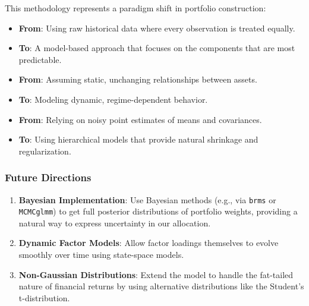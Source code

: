 \documentclass[
]{article}
\providecommand{\tightlist}{%
  \setlength{\itemsep}{0pt}\setlength{\parskip}{0pt}}
\begin{document}
This methodology represents a paradigm shift in portfolio construction:

\begin{itemize}
\tightlist
\item
  \textbf{From}: Using raw historical data where every observation is
  treated equally.
\item
  \textbf{To}: A model-based approach that focuses on the components
  that are most predictable.
\item
  \textbf{From}: Assuming static, unchanging relationships between
  assets.
\item
  \textbf{To}: Modeling dynamic, regime-dependent behavior.
\item
  \textbf{From}: Relying on noisy point estimates of means and
  covariances.
\item
  \textbf{To}: Using hierarchical models that provide natural shrinkage
  and regularization.
\end{itemize}

\subsubsection{Future Directions}\label{future-directions}

\begin{enumerate}
\def\labelenumi{\arabic{enumi}.}
\tightlist
\item
  \textbf{Bayesian Implementation}: Use Bayesian methods (e.g., via
  \texttt{brms} or \texttt{MCMCglmm}) to get full posterior
  distributions of portfolio weights, providing a natural way to express
  uncertainty in our allocation.
\item
  \textbf{Dynamic Factor Models}: Allow factor loadings themselves to
  evolve smoothly over time using state-space models.
\item
  \textbf{Non-Gaussian Distributions}: Extend the model to handle the
  fat-tailed nature of financial returns by using alternative
  distributions like the Student's t-distribution.
\end{enumerate}
\end{document}
